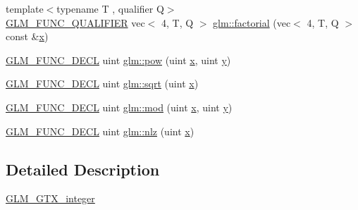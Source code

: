 \begin{DoxyCompactItemize}
\item 
{\footnotesize template$<$typename T , qualifier Q$>$ }\\\mbox{\hyperlink{setup_8hpp_a33fdea6f91c5f834105f7415e2a64407}{G\+L\+M\+\_\+\+F\+U\+N\+C\+\_\+\+Q\+U\+A\+L\+I\+F\+I\+ER}} vec$<$ 4, T, Q $>$ \mbox{\hyperlink{namespaceglm_a10d116af23a576c1e52a6d720b051ca3}{glm\+::factorial}} (vec$<$ 4, T, Q $>$ const \&\mbox{\hyperlink{_s_d_l__opengl_8h_ad0e63d0edcdbd3d79554076bf309fd47}{x}})
\item 
\mbox{\hyperlink{setup_8hpp_ab2d052de21a70539923e9bcbf6e83a51}{G\+L\+M\+\_\+\+F\+U\+N\+C\+\_\+\+D\+E\+CL}} uint \mbox{\hyperlink{group__gtx__integer_gaa8229e850c3cc4ad83492fe390ada044}{glm\+::pow}} (uint \mbox{\hyperlink{_s_d_l__opengl_8h_ad0e63d0edcdbd3d79554076bf309fd47}{x}}, uint \mbox{\hyperlink{_s_d_l__opengl_8h_a1675d9d7bb68e1657ff028643b4037e3}{y}})
\item 
\mbox{\hyperlink{setup_8hpp_ab2d052de21a70539923e9bcbf6e83a51}{G\+L\+M\+\_\+\+F\+U\+N\+C\+\_\+\+D\+E\+CL}} uint \mbox{\hyperlink{group__gtx__integer_ga457e9efca8339bf918d319e9c55f7c8f}{glm\+::sqrt}} (uint \mbox{\hyperlink{_s_d_l__opengl_8h_ad0e63d0edcdbd3d79554076bf309fd47}{x}})
\item 
\mbox{\hyperlink{setup_8hpp_ab2d052de21a70539923e9bcbf6e83a51}{G\+L\+M\+\_\+\+F\+U\+N\+C\+\_\+\+D\+E\+CL}} uint \mbox{\hyperlink{group__gtx__integer_gab8f9ec0ca93ca90669434224818f0750}{glm\+::mod}} (uint \mbox{\hyperlink{_s_d_l__opengl_8h_ad0e63d0edcdbd3d79554076bf309fd47}{x}}, uint \mbox{\hyperlink{_s_d_l__opengl_8h_a1675d9d7bb68e1657ff028643b4037e3}{y}})
\item 
\mbox{\hyperlink{setup_8hpp_ab2d052de21a70539923e9bcbf6e83a51}{G\+L\+M\+\_\+\+F\+U\+N\+C\+\_\+\+D\+E\+CL}} uint \mbox{\hyperlink{group__gtx__integer_gacbe62fd2384464c16ea30ecc4defc11c}{glm\+::nlz}} (uint \mbox{\hyperlink{_s_d_l__opengl_8h_ad0e63d0edcdbd3d79554076bf309fd47}{x}})
\end{DoxyCompactItemize}


\subsection{Detailed Description}
\mbox{\hyperlink{group__gtx__integer}{G\+L\+M\+\_\+\+G\+T\+X\+\_\+integer}} 